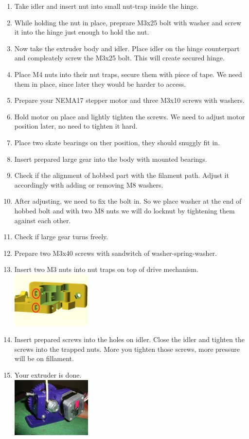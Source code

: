 \documentclass[11pt]{article}
\begin{document}
\begin{enumerate}
\item Take idler and insert nut into small nut-trap inside the hinge.
\item While holding the nut in place, preprare M3x25 bolt with washer and screw it into the hinge just enough to hold the nut.
\item Now take the extruder body and idler. Place idler on the hinge counterpart and compleately screw the M3x25 bolt. This will create secured hinge.
\item Place M4 nuts into their nut traps, secure them with piece of tape. We need them in place, since later they would be harder to access.
\item Prepare your NEMA17 stepper motor and three M3x10 screws with washers.
\item Hold motor on place and lightly tighten the screws. We need to adjust motor position later, no need to tighten it hard.
\item Place two skate bearings on ther position, they should snuggly fit in.
\item Insert prepared large gear into the body with mounted bearings.
\item Check if the alignment of hobbed part with the filament path. Adjust it accordingly with adding or removing M8 washers.
\item After adjusting, we need to fix the bolt in. So we place washer at the end of hobbed bolt and with two M8 nuts we will do locknut by tightening them against each other.
\item Check if large gear turns freely.
\item Prepare two M3x40 screws with sandwitch of washer-spring-washer.
\item Insert two M3 nuts into nut traps on top of drive mechanism.\\ \includegraphics[width=4cm]{images/extruder/top-nut-traps.png}
\item Insert prepared screws into the holes on idler. Close the idler and tighten the screws into the trapped nuts. More you tighten those screws, more pressure will be on fillament.
\item Your extruder is done.\\ \includegraphics[width=4cm]{images/extruder/assembled.jpg}
\end{enumerate}
\end{document}
